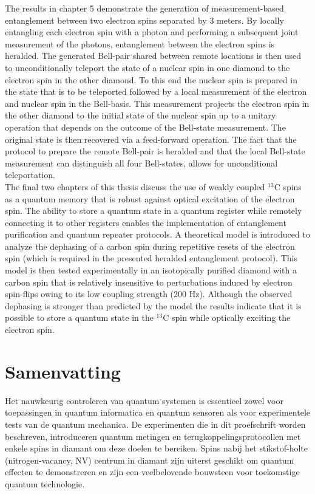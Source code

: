 The results in chapter 5 demonstrate the generation of measurement-based entanglement between two electron spins separated by 3 meters. By locally entangling each electron spin with a photon and performing a subsequent joint measurement of the photons, entanglement between the electron spins is heralded. The generated Bell-pair shared between remote locations is then used to unconditionally teleport the state of a nuclear spin in one diamond to the electron spin in the other diamond. To this end the nuclear spin is prepared in the state that is to be teleported followed by a local measurement of the electron and nuclear spin in the Bell-basis. This measurement projects the electron spin in the other diamond to the initial state of the nuclear spin up to a unitary operation that depends on the outcome of the Bell-state measurement. The original state is then recovered via a feed-forward operation. The fact that the protocol to prepare the remote Bell-pair is heralded and that the local Bell-state measurement can distinguish all four Bell-states, allows for unconditional teleportation. \\

The final two chapters of this thesis discuss the use of weakly coupled $^{13}$C spins as a quantum memory that is robust against optical excitation of the electron spin. The ability to store a quantum state in a quantum register while remotely connecting it to other registers enables the implementation of entanglement purification and quantum repeater protocols. A theoretical model is introduced to analyze the dephasing of a carbon spin during repetitive resets of the electron spin (which is required in the presented heralded entanglement protocol). This model is then tested experimentally in an isotopically purified diamond with a carbon spin that is relatively insensitive to perturbations induced by electron spin-flips owing to its low coupling strength (200 Hz). Although the observed dephasing is stronger than predicted by the model the results indicate that it is possible to store a quantum state in the $^{13}$C spin while optically exciting the electron spin.

\chapter{Samenvatting}

Het nauwkeurig controleren van quantum systemen is essentieel zowel voor toepassingen in quantum informatica en quantum sensoren als voor experimentele tests van de quantum mechanica. De experimenten die in dit proefschrift worden beschreven, introduceren quantum metingen en terugkoppelingsprotocollen met enkele spins in diamant om deze doelen te bereiken. Spins nabij het stikstof-holte (nitrogen-vacancy, NV) centrum in diamant zijn uiterst geschikt om quantum effecten te demonstreren en zijn een veelbelovende bouwsteen voor toekomstige quantum technologie. \\

